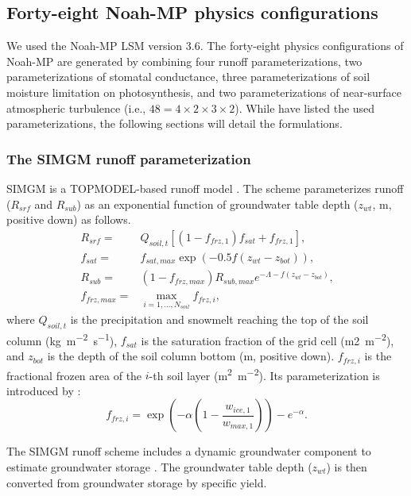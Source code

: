 \documentclass[essd]{copernicus}
\begin{document}
\subsection{Forty-eight Noah-MP physics configurations} \label{sec:data:noahmp}

We used the Noah-MP LSM version 3.6. The forty-eight physics configurations of Noah-MP are generated by combining four runoff parameterizations, two parameterizations of stomatal conductance, three parameterizations of soil moisture limitation on photosynthesis, and two parameterizations of near-surface atmospheric turbulence (i.e., $48 = 4 \times 2 \times 3 \times 2$). While \citet[Table 1]{zheng2019WRR} have listed the used parameterizations, the following sections will detail the formulations.

\subsubsection{The SIMGM runoff parameterization}

SIMGM is a TOPMODEL-based runoff model \citep{niu2007JGRA}. The scheme parameterizes runoff ($R_{srf}$ and $R_{sub}$) as an exponential function of groundwater table depth ($z_{wt}$, \unit{m}, positive down) as follows.
\begin{align}
    R_{srf} =     & Q_{soil,t} [(1 - f_{frz,1}) f_{sat} + f_{frz,1} ] \text{,} \label{eq:SIMGM:rsrf} \\
    f_{sat} =     & f_{sat,max} \exp(-0.5 f (z_{wt} - z_{bot})) \text{,} \label{eq:SIMGM:fsat} \\
    R_{sub} =     & (1 - f_{frz,max}) R_{sub,max} e^{-\Lambda - f(z_{wt} - z_{bot})} \text{,} \label{eq:SIMGM:rsub} \\
    f_{frz,max} = & \max_{i=1,\dots,N_{soil}} f_{frz,i} \label{eq:SIMGM:ffrzmax}\text{,}
\end{align}
where $Q_{soil,t}$ is the precipitation and snowmelt reaching the top of the soil column (\unit{kg~m^{-2}~s^{-1}}), $f_{sat}$ is the saturation fraction of the grid cell (\unit{m2~m^{-2}}), and $z_{bot}$ is the depth of the soil column bottom (\unit{m}, positive down). $f_{frz,i}$ is the fractional frozen area of the $i$-th soil layer (\unit{m^2~m^{-2}}). Its parameterization is introduced by
\citet{niu2006JH}:
\begin{equation}
    f_{frz,i} = \exp\left(-\alpha(1 - \frac{w_{ice,1}}{w_{max,1}})\right) - e^{-\alpha} \text{.}
\end{equation}

The SIMGM runoff scheme includes a dynamic groundwater component to estimate groundwater storage \citep{niu2007JGRA}. The groundwater table depth ($z_{wt}$) is then converted from groundwater storage by specific yield.
\end{document}
